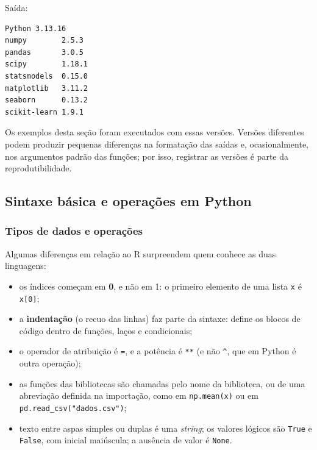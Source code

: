 \documentclass[
]{book}
\providecommand{\tightlist}{%
  \setlength{\itemsep}{0pt}\setlength{\parskip}{0pt}}
\begin{document}
Saída:

\begin{verbatim}
Python 3.13.16
numpy        2.5.3
pandas       3.0.5
scipy        1.18.1
statsmodels  0.15.0
matplotlib   3.11.2
seaborn      0.13.2
scikit-learn 1.9.1
\end{verbatim}

Os exemplos desta seção foram executados com essas versões. Versões diferentes podem produzir pequenas diferenças na formatação das saídas e, ocasionalmente, nos argumentos padrão das funções; por isso, registrar as versões é parte da reprodutibilidade.

\subsection{Sintaxe básica e operações em Python}\label{sintaxe-buxe1sica-e-operauxe7uxf5es-em-python}

\subsubsection{Tipos de dados e operações}\label{tipos-de-dados-e-operauxe7uxf5es}

Algumas diferenças em relação ao R surpreendem quem conhece as duas linguagens:

\begin{itemize}
\tightlist
\item
  os índices começam em \textbf{0}, e não em 1: o primeiro elemento de uma lista \texttt{x} é \texttt{x{[}0{]}};
\item
  a \textbf{indentação} (o recuo das linhas) faz parte da sintaxe: define os blocos de código dentro de funções, laços e condicionais;
\item
  o operador de atribuição é \texttt{=}, e a potência é \texttt{**} (e não \texttt{\^{}}, que em Python é outra operação);
\item
  as funções das bibliotecas são chamadas pelo nome da biblioteca, ou de uma abreviação definida na importação, como em \texttt{np.mean(x)} ou em \texttt{pd.read\_csv("dados.csv")};
\item
  texto entre aspas simples ou duplas é uma \emph{string}; os valores lógicos são \texttt{True} e \texttt{False}, com inicial maiúscula; a ausência de valor é \texttt{None}.
\end{itemize}
\end{document}
